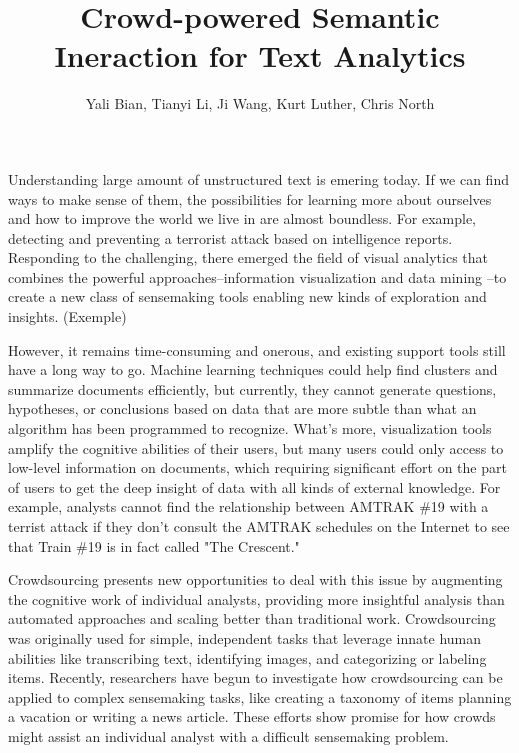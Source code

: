 \documentclass[journal]{vgtc}                %
\title{Crowd-powered Semantic Ineraction for Text Analytics}
\author{Yali Bian, Tianyi Li, Ji Wang, Kurt Luther, Chris North}
\begin{document}
\maketitle
Understanding large amount of unstructured text is emering today. If we can find ways to make sense of them, the possibilities for learning more about ourselves and how to improve the world we live in are almost boundless.
For example, detecting and preventing a terrorist attack based on intelligence reports. Responding to the challenging, there emerged the field of visual analytics\cite{Thomas2005} that combines the powerful approaches--information visualization\cite{card1999readings} and data mining\cite{berry1997data} --to create a new class of sensemaking tools\cite{Pirolli2005} enabling new kinds of exploration and insights. (Exemple)

However, it remains time-consuming and onerous, and existing support tools still have a long way to go. Machine learning techniques could help find clusters and summarize documents efficiently, but currently, they cannot generate questions, hypotheses, or conclusions based on data that are more subtle than what an algorithm has been programmed to recognize. What's more, visualization tools amplify the cognitive abilities of their users, but many users could only access to low-level information on documents, which requiring significant effort on the part of users to get the deep insight of data with all kinds of external knowledge. For example, analysts cannot find the relationship between AMTRAK \#19 with a terrist attack if they don't consult the AMTRAK schedules on the Internet to see that Train \#19 is in fact called "The Crescent."


Crowdsourcing presents new opportunities to deal with this issue by augmenting the cognitive work of individual analysts, providing more insightful analysis than automated approaches and scaling better than traditional work. Crowdsourcing was originally used for simple, independent tasks that leverage innate human abilities like transcribing text\cite{causer2012transcription}, identifying images\cite{gupta2013faking}, and categorizing or labeling items\cite{bragg2013crowdsourcing}. Recently, researchers have begun to investigate how crowdsourcing can be applied to complex sensemaking tasks, like creating a taxonomy of items\cite{Chilton2013} planning a vacation\cite{Zhang2012} or writing a news article\cite{kittur2011crowdforge}. These efforts show promise for how crowds might assist an individual analyst with a difficult sensemaking problem.
\end{document}
